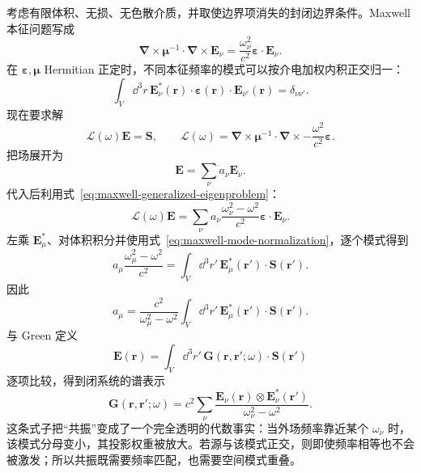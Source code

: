 考虑有限体积、无损、无色散介质，并取使边界项消失的封闭边界条件。Maxwell 本征问题写成
\begin{equation}
\bm\nabla\times\bm\mu^{-1}\cdot\bm\nabla\times\bm E_\nu
=\frac{\omega_\nu^2}{c^2}
\bm\varepsilon\cdot\bm E_\nu.
\label{eq:maxwell-generalized-eigenproblem}
\end{equation}
在 $\bm\varepsilon,\bm\mu$ Hermitian 正定时，不同本征频率的模式可以按介电加权内积正交归一：
\begin{equation}
\int_V\dd^3r\,
\bm E_\nu^*(\bm r)\cdot
\bm\varepsilon(\bm r)\cdot
\bm E_{\nu'}(\bm r)
=\delta_{\nu\nu'}.
\label{eq:maxwell-mode-normalization}
\end{equation}
现在要求解
\begin{equation}
\mathcal L(\omega)\bm E=\bm S,
\qquad
\mathcal L(\omega)
=\bm\nabla\times\bm\mu^{-1}\cdot\bm\nabla\times
-\frac{\omega^2}{c^2}\bm\varepsilon.
\end{equation}
把场展开为
\begin{equation}
\bm E=\sum_\nu a_\nu\bm E_\nu.
\end{equation}
代入后利用式~\eqref{eq:maxwell-generalized-eigenproblem}：
\begin{equation}
\mathcal L(\omega)\bm E
=\sum_\nu a_\nu
\frac{\omega_\nu^2-\omega^2}{c^2}
\bm\varepsilon\cdot\bm E_\nu.
\end{equation}
左乘 $\bm E_\mu^*$、对体积积分并使用式~\eqref{eq:maxwell-mode-normalization}，逐个模式得到
\begin{equation}
 a_\mu
 \frac{\omega_\mu^2-\omega^2}{c^2}
 =\int_V\dd^3r'\,
 \bm E_\mu^*(\bm r')\cdot\bm S(\bm r').
\end{equation}
因此
\begin{equation}
 a_\mu
 =\frac{c^2}{\omega_\mu^2-\omega^2}
 \int_V\dd^3r'\,
 \bm E_\mu^*(\bm r')\cdot\bm S(\bm r').
\end{equation}
与 Green 定义
\begin{equation}
\bm E(\bm r)=\int_V\dd^3r'\,
\mathbf G(\bm r,\bm r';\omega)\cdot\bm S(\bm r')
\end{equation}
逐项比较，得到闭系统的谱表示
\begin{equation}
\boxed{
\mathbf G(\bm r,\bm r';\omega)
=c^2\sum_\nu
\frac{
\bm E_\nu(\bm r)\otimes\bm E_\nu^*(\bm r')
}{\omega_\nu^2-\omega^2}.}
\label{eq:green-closed-spectral}
\end{equation}
这条式子把“共振”变成了一个完全透明的代数事实：当外场频率靠近某个 $\omega_\nu$ 时，该模式分母变小，其投影权重被放大。若源与该模式正交，则即使频率相等也不会被激发；所以共振既需要频率匹配，也需要空间模式重叠。

